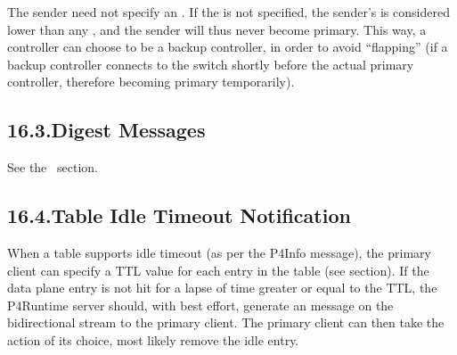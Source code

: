 \documentclass[11pt]{article}
\begin{document}
{%
The sender need not specify an . If the  is not
specified, the sender's  is considered lower than any
, and the sender will thus never become primary. This way, a
controller can choose to be a backup controller, in order to avoid
\textquotedblleft{}flapping\textquotedblright{} (if a backup controller connects to the switch shortly before the
actual primary controller, therefore becoming primary temporarily).%

\subsection{16.3.\hspace*{0.5em}Digest Messages}\label{sec-digest-messages}%

\noindent{}See the~ section.%

\subsection{16.4.\hspace*{0.5em}Table Idle Timeout Notification}\label{sec-table-idle-timeout-notification}%

\noindent{}When a table supports idle timeout (as per the P4Info message), the primary
client can specify a TTL value for each entry in the table (see
 section). If the data plane entry is not hit
for a lapse of time greater or equal to the TTL, the P4Runtime server should,
with best effort, generate an  message on the
 bidirectional stream to the primary client. The primary client
can then take the action of its choice, most likely remove the idle entry.%

}
\end{document}
